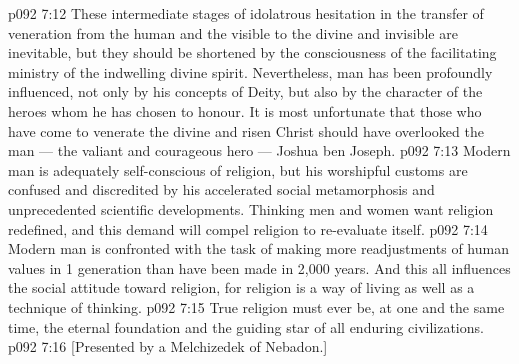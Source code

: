 \vs p092 7:12 These intermediate stages of idolatrous hesitation in the transfer of veneration from the human and the visible to the divine and invisible are inevitable, but they should be shortened by the consciousness of the facilitating ministry of the indwelling divine spirit. Nevertheless, man has been profoundly influenced, not only by his concepts of Deity, but also by the character of the heroes whom he has chosen to honour. It is most unfortunate that those who have come to venerate the divine and risen Christ should have overlooked the man --- the valiant and courageous hero --- Joshua ben Joseph.
\vs p092 7:13 \pc Modern man is adequately self\hyp{}conscious of religion, but his worshipful customs are confused and discredited by his accelerated social metamorphosis and unprecedented scientific developments. Thinking men and women want religion redefined, and this demand will compel religion to re\hyp{}evaluate itself.
\vs p092 7:14 Modern man is confronted with the task of making more readjustments of human values in 1 generation than have been made in 2,000 years. And this all influences the social attitude toward religion, for religion is a way of living as well as a technique of thinking.
\vs p092 7:15 \pc True religion must ever be, at one and the same time, the eternal foundation and the guiding star of all enduring civilizations.
\vsetoff
\vs p092 7:16 [Presented by a Melchizedek of Nebadon.]
\quizlink
